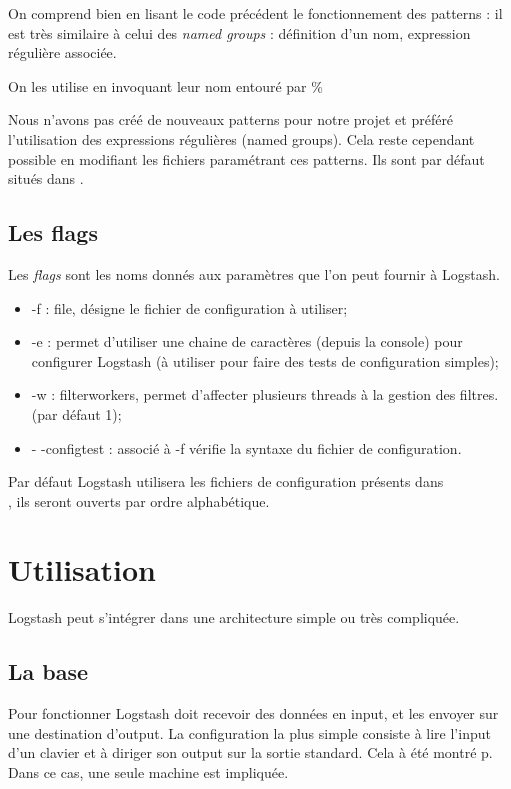On comprend bien en lisant le code précédent le fonctionnement des patterns : il est
très similaire à celui des \textit{named groups} : définition d'un nom, expression
régulière associée. 

On les utilise en invoquant leur nom entouré par \%{} 

Nous n'avons pas créé de nouveaux patterns pour notre projet et préféré l'utilisation
des expressions régulières (named groups). Cela reste cependant possible en modifiant les fichiers 
paramétrant ces patterns. Ils sont par défaut situés dans .


\subsection{Les flags}
\label{subsec:logstashflag}
Les \emph{flags} sont les noms donnés aux paramètres que l'on peut fournir à Logstash.

\begin{itemize}
    \item -f : file, désigne le fichier de configuration à utiliser;
    \item -e : permet d'utiliser une chaine de caractères (depuis la console) pour
    configurer Logstash (à utiliser pour faire des tests de configuration simples);
    \item -w : filterworkers, permet d'affecter plusieurs threads à la gestion des 
    filtres. (par défaut 1);
    \item - -configtest : associé à -f  vérifie la syntaxe 
    du fichier de configuration.
\end{itemize}

Par défaut Logstash utilisera les fichiers de configuration présents dans \\ 
, ils seront ouverts par ordre alphabétique.

\section{Utilisation}
Logstash peut s'intégrer dans une architecture simple ou très compliquée. 


\subsection{La base}
Pour fonctionner Logstash doit recevoir des données en input, et les envoyer sur 
une destination d'output.
La configuration la plus simple consiste à lire l'input d'un clavier et à diriger 
son output sur la sortie standard. Cela à été montré p\pageref{lst:conflogstashminimale}.
Dans ce cas, une seule machine est impliquée. 



